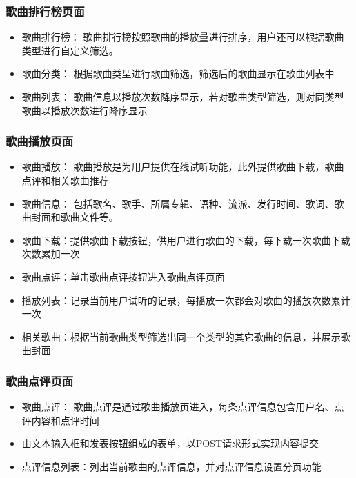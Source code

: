 \documentclass[UTF8,14pt]{article}
\numberwithin{figure}{subsubsection}
\numberwithin{table}{subsubsection}
\begin{document}
\subsubsection{歌曲排行榜页面}
\begin{itemize}
	\setlength{\itemsep}{0pt}
	      \setlength{\parsep}{0pt}
	      \setlength{\parskip}{0pt}

	\item 歌曲排行榜：
	      歌曲排行榜按照歌曲的播放量进行排序，用户还可以根据歌曲类型进行自定义筛选。
	\item 歌曲分类：
	      根据歌曲类型进行歌曲筛选，筛选后的歌曲显示在歌曲列表中
	\item 歌曲列表：
	      歌曲信息以播放次数降序显示，若对歌曲类型筛选，则对同类型歌曲以播放次数进行降序显示
\end{itemize}
\vspace*{-0.3cm}
\subsubsection{歌曲播放页面}
\begin{itemize}
	\setlength{\itemsep}{0pt}
	      \setlength{\parsep}{0pt}
	      \setlength{\parskip}{0pt}
	\item 歌曲播放：
	      歌曲播放是为用户提供在线试听功能，此外提供歌曲下载，歌曲点评和相关歌曲推荐
	\item 歌曲信息：
	      包括歌名、歌手、所属专辑、语种、流派、发行时间、歌词、歌曲封面和歌曲文件等。
	\item 歌曲下载：提供歌曲下载按钮，供用户进行歌曲的下载，每下载一次歌曲下载次数累加一次
	\item 歌曲点评：单击歌曲点评按钮进入歌曲点评页面
	\item 播放列表：记录当前用户试听的记录，每播放一次都会对歌曲的播放次数累计一次
	\item 相关歌曲：根据当前歌曲类型筛选出同一个类型的其它歌曲的信息，并展示歌曲封面
\end{itemize}
\vspace*{-0.3cm}
\subsubsection{歌曲点评页面}
\begin{itemize}
	\setlength{\itemsep}{0pt}
	      \setlength{\parsep}{0pt}
	      \setlength{\parskip}{0pt}
	\item 歌曲点评：
	      歌曲点评是通过歌曲播放页进入，每条点评信息包含用户名、点评内容和点评时间
	\item 由文本输入框和发表按钮组成的表单，以POST请求形式实现内容提交
	\item 点评信息列表：列出当前歌曲的点评信息，并对点评信息设置分页功能
\end{itemize}
\vspace*{-0.3cm}
\end{document}
